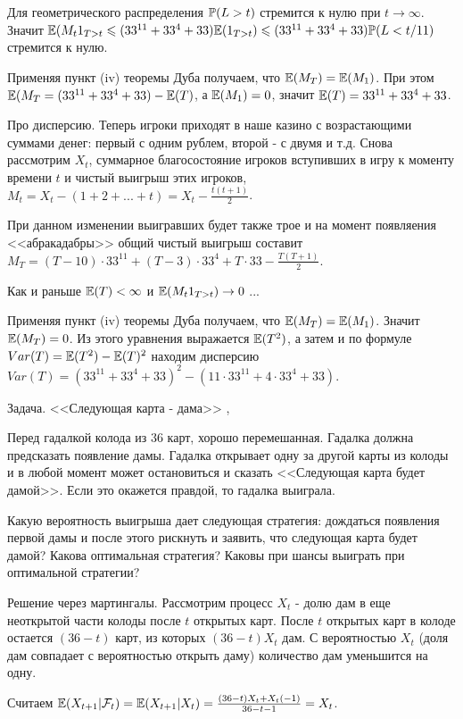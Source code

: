 {Для геометрического распределения $\P(L>t)$ стремится к нулю при $t\to\infty$. Значит $\E(M_{t}1_{T>t}\leq (33^{11}+33^{4}+33)\E(1_{T>t})\leq (33^{11}+33^{4}+33) \P(L<t/11)$ стремится к нулю.

Применяя пункт (iv) теоремы Дуба получаем, что $\E(M_{T})=\E(M_{1})$. При этом $\E(M_{T}=(33^{11}+33^{4}+33)-\E(T)$, а $\E(M_{1})=0$, значит $\E(T)=33^{11}+33^{4}+33$.

Про дисперсию. Теперь игроки приходят в наше казино с возрастающими суммами денег: первый с одним рублем, второй - с двумя и т.д. Снова рассмотрим $X_{t}$, суммарное благосостояние игроков вступивших в игру к моменту времени $t$ и чистый выигрыш этих игроков, $M_{t}=X_{t}-(1+2+...+t)=X_{t}-\frac{t(t+1)}{2}$.

При данном изменении выигравших будет также трое и на момент появляения <<абракадабры>> общий чистый выигрыш составит $M_{T}=(T-10)\cdot 33^{11}+(T-3)\cdot 33^{4}+T\cdot 33-\frac{T(T+1)}{2}$.

Как и раньше $\E(T)<\infty$ и $\E(M_{t}1_{T>t})\to 0$ ...

Применяя пункт (iv) теоремы Дуба получаем, что $\E(M_{T})=\E(M_{1})$. Значит $\E(M_{T})=0$. Из этого уравнения выражается $\E(T^{2})$, а затем и по формуле $Var(T)=\E(T^{2})-\E(T)^{2}$ находим дисперсию $Var(T)=(33^{11}+33^{4}+33)^{2}-(11\cdot 33^{11}+4\cdot 33^{4}+ 33)$.


Задача. <<Следующая карта - дама>> \cite{morters:m}, \cite{winkler:gpdp}

Перед гадалкой колода из 36 карт, хорошо перемешанная. Гадалка
должна предсказать появление дамы. Гадалка открывает
одну за другой карты из колоды и в любой момент может остановиться
и сказать <<Следующая карта будет дамой>>. Если это окажется правдой, то гадалка выиграла. 

Какую вероятность выигрыша дает следующая стратегия: дождаться появления первой дамы и после этого рискнуть и заявить, что следующая карта будет дамой? Какова оптимальная стратегия? Каковы при шансы выиграть при оптимальной стратегии?

Решение через мартингалы. Рассмотрим процесс $X_{t}$ - долю дам в еще неоткрытой части колоды после $t$ открытых карт. После $t$ открытых карт в колоде остается $(36-t)$ карт, из которых $(36-t)X_{t}$ дам. С вероятностью $X_{t}$ (доля дам совпадает с вероятностью открыть даму) количество дам уменьшится на одну.

Считаем $\E(X_{t+1}|\mathcal{F}_{t})=\E(X_{t+1}|X_{t})=\frac{(36-t)X_{t}+X_{t}(-1)}{36-t-1}=X_{t}$.

}
